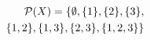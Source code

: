 \documentclass[preview]{standalone}
\begin{document}
\begin{align*}
\special{dvisvgm:raw <g id='unique000'>}\mathcal{P}(X) = \{\emptyset, \{1\}, \{2\}, \{3\}, \\ \{1, 2\}, \{1, 3\}, \{2, 3\}, \{1, 2, 3\}\}\special{dvisvgm:raw </g>}
\end{align*}
\end{document}
